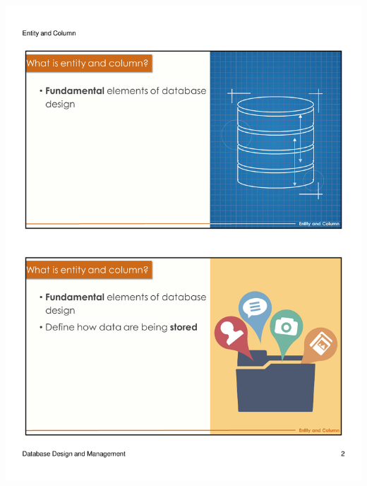 \begin{frame}{ }
    \centering
    \includegraphics[width=\textwidth, trim={10mm 24mm 10mm 134mm}, clip]{resources/02/02_2}
\end{frame}
